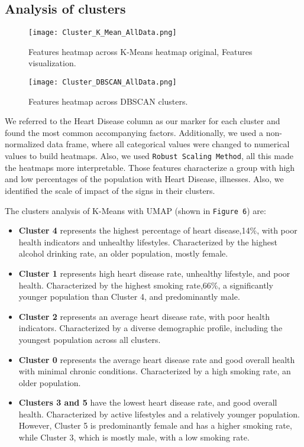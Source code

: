 \documentclass[12pt, a4paper]{article}
\begin{document}
\subsection{Analysis of clusters}
\begin{figure}[htbp]
  \centering
  \begin{minipage}{0.48\textwidth}
    \centering
    \texttt{[image: Cluster\_K\_Mean\_AllData.png]}
    \caption{Features heatmap across K-Means heatmap original, Features visualization.}
    \label{fig:K-Mean_UMAP_plot}
  \end{minipage}
  \hfill
  \begin{minipage}{0.48\textwidth}
    \centering
    \texttt{[image: Cluster\_DBSCAN\_AllData.png]}
    \caption{Features heatmap across DBSCAN clusters.}
    \label{fig:DBSCAN_UMAP_plot}
  \end{minipage}
\end{figure}
\hspace*{1em}
We referred to the Heart Disease column as our marker for each cluster and found the most common accompanying factors. Additionally, we used a non-normalized data frame, where all categorical values were changed to numerical values to build heatmaps. Also, we used \texttt{Robust Scaling Method}, all this made the heatmaps more interpretable. Those features characterize a group with high and low percentages of the population with Heart Disease, illnesses. Also, we identified the scale of impact of the signs in their clusters. 

The clusters analysis of K-Means with UMAP (shown in \texttt{Figure 6}) are:
\begin{itemize}

\item \textbf{Cluster 4} represents the highest percentage of heart disease,14\%, with poor health indicators and unhealthy lifestyles. Characterized by the highest alcohol drinking rate, an older population, mostly female.
\item \textbf{Cluster 1} represents high heart disease rate, unhealthy lifestyle, and poor health. Characterized by the highest smoking rate,66\%, a significantly younger population than Cluster 4, and predominantly male.
\item \textbf{Cluster 2} represents an average heart disease rate, with poor health indicators. Characterized by a diverse demographic profile, including the youngest population across all clusters.
\item \textbf{Cluster 0} represents the average heart disease rate and good overall health with minimal chronic conditions. Characterized by a high smoking rate, an older population.
\item \textbf{Clusters 3 and 5} have the lowest heart disease rate, and good overall health. Characterized by active lifestyles and a relatively younger population. However, Cluster 5 is predominantly female and has a higher smoking rate, while Cluster 3, which is mostly male, with a low smoking rate.


\end{itemize}
\end{document}

